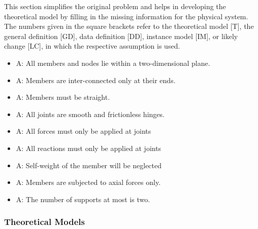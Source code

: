\documentclass[12pt]{article}
\newcounter{assumpnum} %
\begin{document}
This section simplifies the original problem and helps in developing the
theoretical model by filling in the missing information for the physical
system. The numbers given in the square brackets refer to the theoretical model
[T], the general definition [GD], data definition [DD], instance model [IM], or
likely change [LC], in which the respective assumption is used.

\begin{itemize}

\item{A\theassumpnum \label{planar}: All members and nodes lie within a two-dimensional plane.}

\item{A\theassumpnum \label{connection}: Members are inter-connected only at their ends.}
\item{A\theassumpnum \label{as_straight}: Members must be straight.}
\item{A\theassumpnum \label{frictionless}: All joints are smooth and frictionless hinges.}
\item{A\theassumpnum \label{Force_at_joints}: All forces must only be applied at joints}
\item{A\theassumpnum \label{reaction_at_joints}: All reactions must only be applied at joints}
\item{A\theassumpnum \label{self_w}: Self-weight of the member will be neglected}
\item{A\theassumpnum \label{axial_fmem}: Members are subjected to axial forces only.}
\item{A\theassumpnum \label{maxsupport}: The number of supports at most is two.}



\end{itemize}

\subsubsection{Theoretical Models}\label{sec_theoretical}
\end{document}
